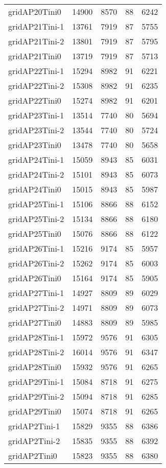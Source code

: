 \documentclass[../../../thesis.tex]{subfiles}
\begin{document}
\begin{longtable}{lrrrr}
gridAP20Tini0 & 14900 & 8570 & 88 & 6242 \\
gridAP21Tini-1 & 13761 & 7919 & 87 & 5755 \\
gridAP21Tini-2 & 13801 & 7919 & 87 & 5795 \\
gridAP21Tini0 & 13719 & 7919 & 87 & 5713 \\
gridAP22Tini-1 & 15294 & 8982 & 91 & 6221 \\
gridAP22Tini-2 & 15308 & 8982 & 91 & 6235 \\
gridAP22Tini0 & 15274 & 8982 & 91 & 6201 \\
gridAP23Tini-1 & 13514 & 7740 & 80 & 5694 \\
gridAP23Tini-2 & 13544 & 7740 & 80 & 5724 \\
gridAP23Tini0 & 13478 & 7740 & 80 & 5658 \\
gridAP24Tini-1 & 15059 & 8943 & 85 & 6031 \\
gridAP24Tini-2 & 15101 & 8943 & 85 & 6073 \\
gridAP24Tini0 & 15015 & 8943 & 85 & 5987 \\
gridAP25Tini-1 & 15106 & 8866 & 88 & 6152 \\
gridAP25Tini-2 & 15134 & 8866 & 88 & 6180 \\
gridAP25Tini0 & 15076 & 8866 & 88 & 6122 \\
gridAP26Tini-1 & 15216 & 9174 & 85 & 5957 \\
gridAP26Tini-2 & 15262 & 9174 & 85 & 6003 \\
gridAP26Tini0 & 15164 & 9174 & 85 & 5905 \\
gridAP27Tini-1 & 14927 & 8809 & 89 & 6029 \\
gridAP27Tini-2 & 14971 & 8809 & 89 & 6073 \\
gridAP27Tini0 & 14883 & 8809 & 89 & 5985 \\
gridAP28Tini-1 & 15972 & 9576 & 91 & 6305 \\
gridAP28Tini-2 & 16014 & 9576 & 91 & 6347 \\
gridAP28Tini0 & 15932 & 9576 & 91 & 6265 \\
gridAP29Tini-1 & 15084 & 8718 & 91 & 6275 \\
gridAP29Tini-2 & 15094 & 8718 & 91 & 6285 \\
gridAP29Tini0 & 15074 & 8718 & 91 & 6265 \\
gridAP2Tini-1 & 15829 & 9355 & 88 & 6386 \\
gridAP2Tini-2 & 15835 & 9355 & 88 & 6392 \\
gridAP2Tini0 & 15823 & 9355 & 88 & 6380 \\

\end{longtable}
\end{document}
